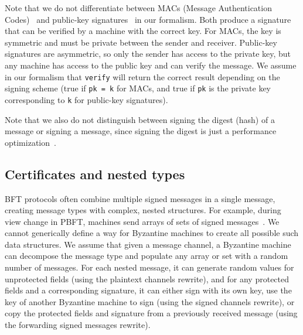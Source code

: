 Note that we do not differentiate between MACs (Message Authentication Codes)~\cite{MAC} and public-key signatures~\cite{signature} in our formalism.
Both produce a signature that can be verified by a machine with the correct key.
For MACs, the key is symmetric and must be private between the sender and receiver.
Public-key signatures are asymmetric, so only the sender has access to the private key, but any machine has access to the public key and can verify the message.
We assume in our formalism that \texttt{verify} will return the correct result depending on the signing scheme (true if \texttt{pk = k} for MACs, and true if \texttt{pk} is the private key corresponding to \texttt{k} for public-key signatures).

Note that we also do not distinguish between signing the digest (hash) of a message or signing a message, since signing the digest is just a performance optimization~\cite{pbft}.

\subsection{Certificates and nested types}
\label{sec:certificate-channels-formalism}
BFT protocols often combine multiple signed messages in a single message, creating message types with complex, nested structures.
For example, during view change in PBFT, machines send arrays of sets of signed messages~\cite{pbft}.
We cannot generically define a way for Byzantine machines to create all possible such data structures.
We assume that given a message channel, a Byzantine machine can decompose the message type and populate any array or set with a random number of messages.
For each nested message, it can generate random values for unprotected fields (using the plaintext channels rewrite), and for any protected fields and a corresponding signature, it can either sign with its own key, use the key of another Byzantine machine to sign (using the signed channels rewrite), or copy the protected fields and signature from a previously received message (using the forwarding signed messages rewrite).
